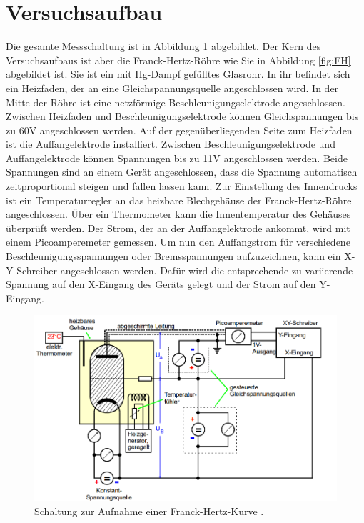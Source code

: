 \section{Versuchsaufbau}
Die gesamte Messschaltung ist in Abbildung \ref{fig:Mess} abgebildet.
Der Kern des Versuchsaufbaus ist aber die Franck-Hertz-Röhre wie Sie in Abbildung \ref{fig:FH} abgebildet ist. Sie ist ein
mit Hg-Dampf gefülltes Glasrohr. In ihr befindet sich ein Heizfaden, der an eine Gleichspannungsquelle
angeschlossen wird. In der Mitte der Röhre ist eine netzförmige Beschleunigungselektrode angeschlossen.
Zwischen Heizfaden und Beschleunigungselektrode können Gleichspannungen bis zu 60V angeschlossen werden.
Auf der gegenüberliegenden Seite zum Heizfaden ist die Auffangelektrode installiert.
Zwischen Beschleunigungselektrode und Auffangelektrode können Spannungen bis zu 11V angeschlossen werden.
Beide Spannungen sind an einem Gerät angeschlossen, dass die Spannung automatisch zeitproportional 
steigen und fallen lassen kann. Zur Einstellung des Innendrucks ist ein Temperaturregler
an das heizbare Blechgehäuse der Franck-Hertz-Röhre angeschlossen. Über ein Thermometer 
kann die Innentemperatur des Gehäuses überprüft werden. Der Strom, der 
an der Auffangelektrode ankommt, wird mit einem Picoamperemeter gemessen. Um nun den 
Auffangstrom für verschiedene Beschleunigungsspannungen oder Bremsspannungen aufzuzeichnen,
kann ein X-Y-Schreiber angeschlossen werden. Dafür wird die entsprechende zu variierende Spannung auf den X-Eingang
des Geräts gelegt und der Strom auf den Y-Eingang.
\begin{figure}[H]
    \centering
    \includegraphics[scale=0.8]{content/Messschaltung.png}
    \caption{Schaltung zur Aufnahme einer Franck-Hertz-Kurve \cite{sample}.}
    \label{fig:Mess}
\end{figure}

